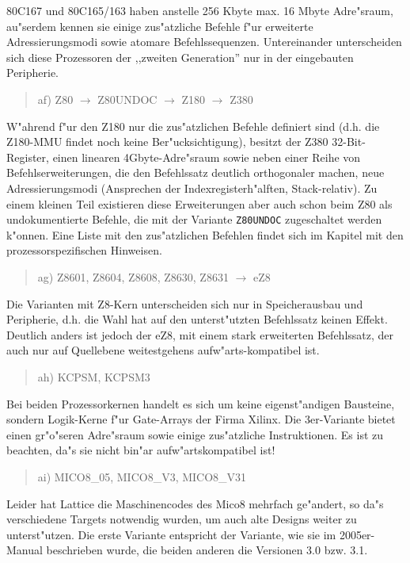 \documentclass[12pt,a4paper,twoside]{report}
\newcommand{\tty}[1]{{\tt #1}}
\begin{document}
{\begin{quote}
\end{quote}
80C167 und 80C165/163 haben anstelle 256 Kbyte max. 16 Mbyte Adre"sraum,
au"serdem kennen sie einige zus"atzliche Befehle f"ur erweiterte
Adressierungsmodi sowie atomare Befehlssequenzen.  Untereinander
unterscheiden sich diese Prozessoren der ,,zweiten Generation'' nur in der
eingebauten Peripherie.
\begin{quote}
af) Z80 $\rightarrow$ Z80UNDOC $\rightarrow$ Z180 $\rightarrow$ Z380
\end{quote}
W"ahrend f"ur den Z180 nur die zus"atzlichen Befehle definiert sind
(d.h. die Z180-MMU findet noch keine Ber"ucksichtigung), besitzt der
Z380 32-Bit-Register, einen linearen 4Gbyte-Adre"sraum sowie neben
einer Reihe von Befehlserweiterungen, die den Befehlssatz deutlich
orthogonaler machen, neue Adressierungsmodi (Ansprechen der
Indexregisterh"alften, Stack-relativ).  Zu einem kleinen Teil existieren
diese Erweiterungen aber auch schon beim Z80 als undokumentierte
Befehle, die mit der Variante \tty{Z80UNDOC} zugeschaltet werden
k"onnen.  Eine Liste mit den zus"atzlichen Befehlen findet sich im
Kapitel mit den prozessorspezifischen Hinweisen.
\begin{quote}
ag) Z8601, Z8604, Z8608, Z8630, Z8631 $\rightarrow$ eZ8
\end{quote}
Die Varianten mit Z8-Kern unterscheiden sich nur in
Speicherausbau und Peripherie, d.h. die Wahl hat auf den
unterst"utzten Befehlssatz keinen Effekt.  Deutlich anders ist
jedoch der eZ8, mit einem stark erweiterten Befehlssatz, der auch
nur auf Quellebene weitestgehens aufw"arts-kompatibel ist.
\begin{quote}
ah) KCPSM, KCPSM3
\end{quote}
Bei beiden Prozessorkernen handelt es sich um keine eigenst"andigen
Bausteine, sondern Logik-Kerne f"ur Gate-Arrays der Firma Xilinx.  Die
3er-Variante bietet einen gr"o"seren Adre"sraum sowie einige zus"atzliche
Instruktionen.  Es ist zu beachten, da"s sie nicht bin"ar
aufw"artskompatibel ist!
\begin{quote}
ai) MICO8\_05, MICO8\_V3, MICO8\_V31
\end{quote}
Leider hat Lattice die Maschinencodes des Mico8 mehrfach ge"andert, so
da"s verschiedene Targets notwendig wurden, um auch alte Designs weiter
zu unterst"utzen.  Die erste Variante entspricht der Variante, wie sie
im 2005er-Manual beschrieben wurde, die beiden anderen die Versionen 3.0
bzw. 3.1.
\begin{quote}

\end{quote}}
\end{document}
